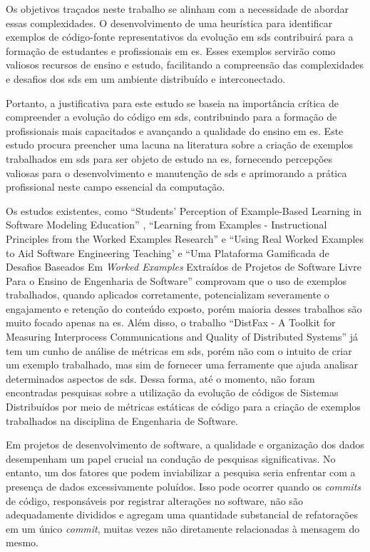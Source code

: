 Os objetivos traçados neste trabalho se alinham com a necessidade de abordar essas complexidades. O desenvolvimento de uma heurística para identificar exemplos de código-fonte representativos da evolução em \gls{sds} contribuirá para a formação de estudantes e profissionais em \gls{es}. Esses exemplos servirão como valiosos recursos de ensino e estudo, facilitando a compreensão das complexidades e desafios dos \gls{sds} em um ambiente distribuído e interconectado.

Portanto, a justificativa para este estudo se baseia na importância crítica de compreender a evolução do código em \gls{sds}, contribuindo para a formação de profissionais mais capacitados e avançando a qualidade do ensino em \gls{es}. Este estudo procura preencher uma lacuna na literatura sobre a criação de exemplos trabalhados em \gls{sds} para ser objeto de estudo na \gls{es}, fornecendo percepções valiosas para o desenvolvimento e manutenção de \gls{sds} e aprimorando a prática profissional neste campo essencial da computação.

Os estudos existentes, como ``Students' Perception of Example-Based Learning in Software Modeling Education'' \cite{Tiago.Bonetti-etal:2023}, ``Learning from Examples - Instructional Principles from the Worked Examples Research'' \cite{Robert.Atkinson-etal:2000} e ``Using Real Worked Examples to Aid Software Engineering Teaching' \cite{Simone.Tonhao-etal:2021} e ``Uma Plataforma Gamificada de Desafios Baseados Em \textit{Worked Examples} Extraídos de Projetos de Software Livre Para o Ensino de Engenharia de Software'' \cite{Simone.Tonhao-etal:2022} comprovam que o uso de exemplos trabalhados, quando aplicados corretamente, potencializam severamente o engajamento e retenção do conteúdo exposto, porém maioria desses trabalhos são muito focado apenas na \gls{es}. Além disso, o trabalho ``DistFax - A Toolkit for Measuring Interprocess Communications and Quality of Distributed Systems''\cite{DistFax} já tem um cunho de análise de métricas em \gls{sds}, porém não com o intuito de criar um exemplo trabalhado, mas sim de fornecer uma ferramente que ajuda analisar determinados aspectos de \gls{sds}. Dessa forma, até o momento, não foram encontradas pesquisas sobre a utilização da evolução de códigos de Sistemas Distribuídos por meio de métricas estáticas de código para a criação de exemplos trabalhados na disciplina de Engenharia de Software.

Em projetos de desenvolvimento de software, a qualidade e organização dos dados desempenham um papel crucial na condução de pesquisas significativas. No entanto, um dos fatores que podem inviabilizar a pesquisa seria enfrentar com a presença de dados excessivamente poluídos. Isso pode ocorrer quando os \textit{commits} de código, responsáveis por registrar alterações no software, não são adequadamente divididos e agregam uma quantidade substancial de refatorações em um único \textit{commit}, muitas vezes não diretamente relacionadas à mensagem do mesmo.

